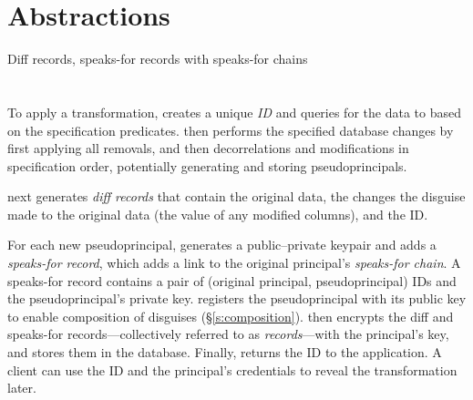 \section{Abstractions}
Diff records, speaks-for records with speaks-for chains


\section{\Xxing}
\label{s:applying}

To apply a \xxing transformation, \sys creates a unique \emph{\xx ID} and
queries for the data to \xx based on the \xx specification predicates.
%
\sys then performs the specified database changes by first applying all
removals, and then decorrelations and modifications in specification order,
potentially generating and storing pseudoprincipals.
%
%

%
\sys next generates \emph{diff records} that contain the original data, the
changes the disguise made to the original data (\eg the value of any modified
columns), and the \xx ID.
%


For each new pseudoprincipal, \sys generates a public--private keypair and adds
a \emph{speaks-for record}, which adds a link to the original principal's
\emph{speaks-for chain}.
A speaks-for record contains a pair of (original principal,
pseudoprincipal) IDs and the pseudoprincipal’s
private key. \sys registers the pseudoprincipal with its public key to enable
composition of disguises (\S\ref{s:composition}).
%
\sys then encrypts the diff and speaks-for records---collectively
referred to as \emph{\xx records}---with the principal's key,
and stores them in the database.
%
%
%
Finally, \sys returns the \xx ID to the application.
%
A client can use the \xx ID and the principal's
credentials to reveal the transformation later.
%

